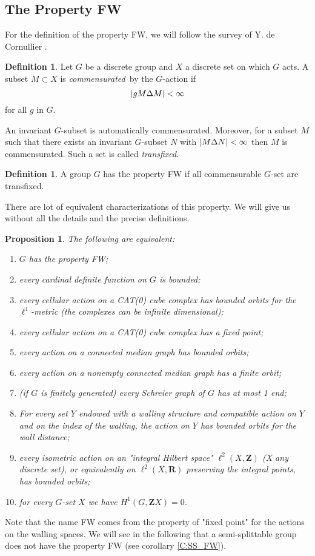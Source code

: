 \documentclass[a4paper]{article}
\newtheorem{prop}[lem]{Proposition}
\theoremstyle{definition}
\newtheorem{defn}[lem]{Definition}
\theoremstyle{remark}%
\DeclarePairedDelimiter\abs{\lvert}{\rvert}
\newcommand*{\field}[1]{\mathbf{#1}}
\newcommand*{\Z}{\field{Z}}
\newcommand*{\R}{\field{R}}
\begin{document}
\subsection{The Property FW}
%
For the definition of the property FW, we will follow the survey of Y. de Cornullier \cite{Cornulier2013}.
%
\begin{defn}
Let $G$ be a discrete group and $X$ a discrete set on which $G$ acts. A subset $M \subset X$ is \emph{commensurated} by the $G$-action if 
\begin{equation*}
\abs{gM \Delta M} < \infty 
\end{equation*}
for all $g$ in $G$.
\end{defn}
An invariant $G$-subset is automatically  commensurated. Moreover, for a subset $M$ such that there exists an invariant $G$-subset $N$ with $\abs{M \Delta N}< \infty$ then $M$ is commensurated. 
Such a set is called \emph{transfixed}.
%
%
\begin{defn}
A group $G$ has the property FW if all commensurable $G$-set are transfixed.
\end{defn}
There are lot of equivalent characterizations of this property. We will give us without all the details and the precise definitions.
%
%
\begin{prop}\label{P:charact_FW}
The following are equivalent:
\begin{enumerate}
\item\label{C:FW_def} $G$ has the property FW;
\item every cardinal definite function on $G$ is bounded;
\item\label{C:FW_Cat(0)} every cellular action on a CAT(0) cube complex has bounded orbits for the $\ell^1$-metric (the complexes can be infinite dimensional);
\item every cellular action on a CAT(0) cube complex has a fixed point;
\item \label{C_FW_MedianGRaph}every action on a connected median graph has bounded orbits;
\item every action on a nonempty connected median graph has a finite orbit;
\item \label{C:FW_Schrei} (if $G$ is finitely generated) every Schreier graph of $G$ has at most 1 end;
\item \label{C:FW_Wallings}For every set $Y$ endowed with a walling structure and compatible action on $Y$ and on the index of the walling, the action on $Y$ has bounded orbits for the wall distance;
\item \label{C:FW_Hilbert} every isometric action on an "integral Hilbert space" $\ell^2(X,\Z)$ (X any discrete set), or equivalently on $\ell^2(X,\R)$ preserving the integral points, has bounded orbits;
\item for every $G$-set $X$ we have $H^1(G,\Z X)=0$.
\end{enumerate}
\end{prop}
Note that the name FW comes from the property of "fixed point" for the actions on the walling spaces. We will see in the following that a semi-splittable group does not have the property FW (see corollary \ref{C:SS_FW}).
%
\end{document}
